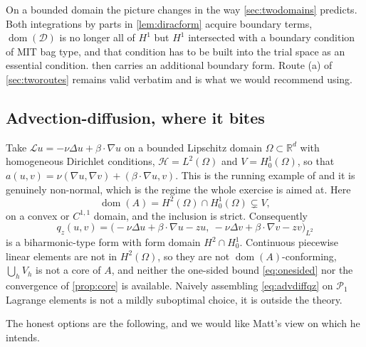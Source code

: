 \documentclass[11pt,a4paper]{article}
\theoremstyle{plain}
\newcommand{\R}{\mathbb{R}}
\newcommand{\Hb}{\mathcal{H}}
\newcommand{\Vb}{V}
\newcommand{\Lop}{\mathcal{L}}
\newcommand{\Dop}{\mathcal{D}}
\DeclareMathOperator{\dom}{dom}
\begin{document}
On a bounded domain the picture changes in the way \cref{sec:twodomains}
predicts.  Both integrations by parts in \cref{lem:diracform} acquire boundary
terms, $\dom(\Dop)$ is no longer all of $H^1$ but $H^1$ intersected with a
boundary condition of MIT bag type, and that condition has to be built into the
trial space as an essential condition.   then carries an
additional boundary form.  Route (a) of \cref{sec:tworoutes} remains valid
verbatim and is what we would recommend using.

\subsection{Advection-diffusion, where it bites}
\label{sec:advdiff}

Take $\Lop u = -\nu\Delta u + \beta\cdot\nabla u$ on a bounded Lipschitz domain
$\Omega \subset \R^d$ with homogeneous Dirichlet conditions, $\Hb = L^2(\Omega)$
and $\Vb = H^1_0(\Omega)$, so that $a(u,v) = \nu(\nabla u, \nabla v) +
(\beta\cdot\nabla u, v)$.  This is the running example of
\cite[\S3]{LazzarinoNakatsukasaZerbinati2026} and it is genuinely non-normal,
which is the regime the whole exercise is aimed at.  Here
\begin{equation}
  \label{eq:advdiffdom}
  \dom(A) = H^2(\Omega) \cap H^1_0(\Omega) \subsetneq \Vb ,
\end{equation}
on a convex or $C^{1,1}$ domain, and the inclusion is strict.  Consequently
\begin{equation}
  \label{eq:advdiffqz}
  q_z(u,v) = \bigl(-\nu\Delta u + \beta\cdot\nabla u - zu,\
                    -\nu\Delta v + \beta\cdot\nabla v - zv\bigr)_{L^2}
\end{equation}
is a biharmonic-type form with form domain $H^2 \cap H^1_0$.  Continuous
piecewise linear elements are not in $H^2(\Omega)$, so they are not
$\dom(A)$-conforming, $\bigcup_h V_h$ is not a core of $A$, and neither the
one-sided bound \cref{eq:onesided} nor the convergence of \cref{prop:core} is
available.  Naively assembling \cref{eq:advdiffqz} on $\mathcal{P}_1$ Lagrange
elements is not a mildly suboptimal choice, it is outside the theory.

The honest options are the following, and we would like Matt's view on which he
intends.
\end{document}
